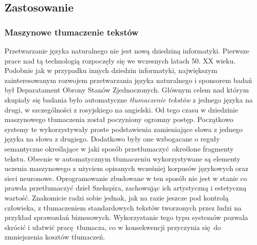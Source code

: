 \documentclass[a4paper, twoside, 12pt]{report}
\begin{document}
        \subsection {Zastosowanie}
            \subsubsection{Maszynowe tłumaczenie tekstów}
                Przetwarzanie języka naturalnego nie jest nową dziedziną informatyki. Pierwsze prace nad tą technologią
                rozpoczęły się we wczesnych latach 50. XX wieku. Podobnie jak w przypadku innych dziedzin informatyki,
                największym zainteresowanym rozwojem przetwarzania języka naturalnego i sponsorem badań był Deparatament
                Obrony Stanów Zjednoczonych. Głównym celem nad którym skupiały się badania było automatyczne
                \emph{tłumaczenie tekstów} z jednego języka na drugi, w szczególności z rosyjskiego na
                angielski\cite{NLPHISTORY}. Od tego czasu w dziedzinie maszynowego tłumaczenia został poczyniony
                ogromny postęp. Początkowo systemy te wykorzystywały proste podstawienia zamieniające słowa z jednego
                języka na słowa z drugiego. Dodatkowo były one wzbogacane o reguły semantyczne określające w jaki
                sposób przetłumaczyć określone fragmenty tekstu.  Obecnie w automatycznym tłumaczeniu wykorzystywane
                są elementy uczenia maszynowego z użyciem opisanych wcześniej korpusów językowych oraz sieci neuronowe.
                Oprogramowanie zbudowane w ten sposób nie jest w stanie co prawda przetłumaczyć dzieł Szekspira,
                zachowując ich artystyczną i estetyczną wartość. Znakomicie radzi sobie jednak, jak na razie jeszcze
                pod kontrolą człowieka, z tłumaczeniem standardowych tekstów tworzonych przez ludzi na przykład
                sprawozdań biznesowych\cite{INTROTOMACHINETRANSLATION}. Wykorzystanie tego typu systemów pozwala skrócić i
                ułatwić pracę tłumacza, co w konsekwencji przyczynia się do zmniejszenia kosztów tłumaczeń.
\end{document}
